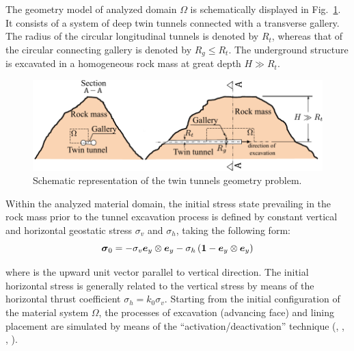 \documentclass[Journal,letterpaper, NoLists,SectionNumbers]{ascelike-new}
\begin{document}
The geometry model of analyzed domain $\Omega$ is schematically displayed in Fig.~\ref{domain}. It consists of a system of deep twin tunnels connected with a transverse gallery. The radius of the circular longitudinal tunnels is denoted by $R_t$, whereas that of the circular connecting gallery is denoted by $R_g \le R_t$. The underground structure is excavated in a homogeneous rock mass at great depth $H \gg R_t$.
\begin{figure}[h!]
	\centering
	\includegraphics[scale=1]{Domain.pdf}
	\caption{Schematic representation of the twin tunnels geometry problem.}
	\label{domain}
\end{figure}
Within the analyzed material domain, the initial stress state prevailing in the rock mass prior to the tunnel excavation process is defined by constant vertical and horizontal geostatic stress $\sigma_v$ and $\sigma_h$, taking the following form:
\begin{equation} \label{eq:stress0}
	\boldsymbol{\sigma}_0 = -\sigma_v \boldsymbol{e}_y \otimes \boldsymbol{e}_y - \sigma_h\left( \boldsymbol{1} - \boldsymbol{e}_y \otimes \boldsymbol{e}_y \right)
\end{equation}

where is the upward unit vector parallel to vertical direction. The initial horizontal stress is generally related to the vertical stress by means of the horizontal thrust coefficient $\sigma_h = k_0 \sigma_v$. Starting from the initial configuration of the material system $\Omega$, the processes of excavation (advancing face) and lining placement are simulated by means of the “activation/deactivation” technique (, , , ).
\end{document}
